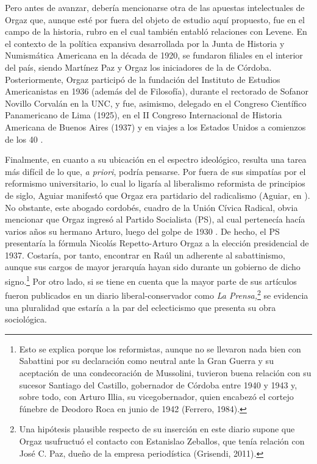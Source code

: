 Pero antes de avanzar, debería mencionarse otra de las apuestas intelectuales de Orgaz que, aunque esté por fuera del objeto de estudio aquí propuesto, fue en el campo de la historia, rubro en el cual también entabló relaciones con Levene. En el contexto de la política expansiva desarrollada por la Junta de Historia y Numismática Americana en la década de 1920, se fundaron filiales en el interior del país, siendo Martínez Paz y Orgaz los iniciadores de la de Córdoba. Posteriormente, Orgaz participó de la fundación del Instituto de Estudios Americanistas en 1936 (además del de Filosofía), durante el rectorado de Sofanor Novillo Corvalán en la UNC, y fue, asimismo, delegado en el Congreso Científico Panamericano de Lima (1925), en el II Congreso Internacional de Historia Americana de Buenos Aires (1937) y en viajes a los Estados Unidos a comienzos de los 40 \parencite{1528-REQUENA2010}.

Finalmente, en cuanto a su ubicación en el espectro ideológico, resulta una tarea más difícil de lo que, \emph{a priori}, podría pensarse. Por fuera de sus simpatías por el reformismo universitario, lo cual lo ligaría al liberalismo reformista de principios de siglo, Aguiar manifestó que Orgaz era partidario del radicalismo (Aguiar, en \cite{1544-ORGAZ1960}). No obstante, este abogado cordobés, cuadro de la Unión Cívica Radical, obvia mencionar que Orgaz ingresó al Partido Socialista (PS), al cual pertenecía hacía varios años su hermano Arturo, luego del golpe de 1930 \parencite{1507-TCACH2012}. De hecho, el PS presentaría la fórmula Nicolás Repetto-Arturo Orgaz a la elección presidencial de 1937. Costaría, por tanto, encontrar en Raúl un adherente al sabattinismo, aunque sus cargos de mayor jerarquía hayan sido durante un gobierno de dicho signo.\footnote{Esto se explica porque los reformistas, aunque no se llevaron nada bien con Sabattini por su declaración como neutral ante la Gran Guerra y su aceptación de una condecoración de Mussolini, tuvieron buena relación con su sucesor Santiago del Castillo, gobernador de Córdoba entre 1940 y 1943 y, sobre todo, con Arturo Illia, su vicegobernador, quien encabezó el cortejo fúnebre de Deodoro Roca en junio de 1942 (Ferrero, 1984).} Por otro lado, si se tiene en cuenta que la mayor parte de sus artículos fueron publicados en un diario liberal-conservador como \emph{La Prensa,}\footnote{Una hipótesis plausible respecto de su inserción en este diario supone que Orgaz usufructuó el contacto con Estanislao Zeballos, que tenía relación con José C. Paz, dueño de la empresa periodística (Grisendi, 2011).} se evidencia una pluralidad que estaría a la par del eclecticismo que presenta su obra sociológica.

